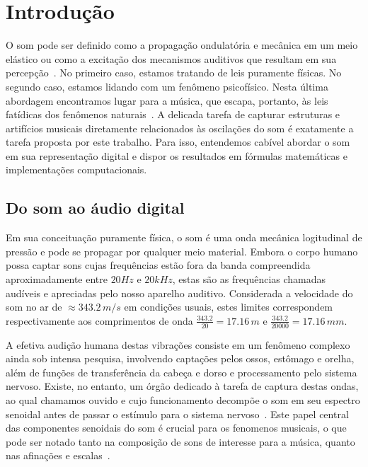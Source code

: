 \chapter{Introdução} %
\label{cap:intro} 

O som pode ser definido como a propagação ondulatória e mecânica em um meio elástico
ou como a excitação dos mecanismos auditivos que resultam em sua percepção~\cite{Everest}. No primeiro
caso, estamos tratando de leis puramente físicas. No segundo caso, estamos lidando com um
fenômeno psicofísico. Nesta última abordagem encontramos lugar para a música, que escapa,
portanto, às leis fatídicas dos fenômenos naturais~\cite{Roederer}. A delicada tarefa de capturar estruturas
e artifícios musicais diretamente relacionados às oscilações do som
é exatamente a tarefa proposta por este trabalho. Para isso, entendemos cabível
abordar o som em sua representação digital e dispor os resultados em fórmulas matemáticas e implementações computacionais. 


    \section{Do som ao áudio digital}

Em sua conceituação puramente física, o som é uma onda mecânica logitudinal de pressão e pode se propagar por qualquer meio material.
Embora o corpo humano possa captar sons cujas frequências estão fora da banda compreendida aproximadamente entre $20Hz$ e $20 kHz$, estas são as frequências chamadas audíveis e apreciadas pelo nosso aparelho auditivo.
 Considerada a velocidade do som no ar de $\approx 343.2\,m/s$ em condições usuais,
estes limites correspondem respectivamente aos comprimentos de onda $\frac{343.2}{20} = 17.16\,m$ e $\frac{343.2}{20000}=17.16\,mm$.

A efetiva audição humana destas vibrações consiste em um fenômeno complexo ainda sob intensa pesquisa, involvendo captações pelos ossos, estômago e orelha, além de funções de transferência da cabeça e dorso e processamento pelo sistema nervoso. Existe, no entanto, um órgão dedicado à tarefa de captura destas ondas, ao qual chamamos ouvido e cujo funcionamento decompõe o som em seu espectro senoidal antes de passar o estímulo para o sistema nervoso~\cite{Roederer}. Este papel central das componentes senoidais do som é crucial para os fenomenos musicais, o que pode ser notado tanto na composição de sons de interesse para a música, quanto nas afinações e escalas~\cite{floEsp}.

